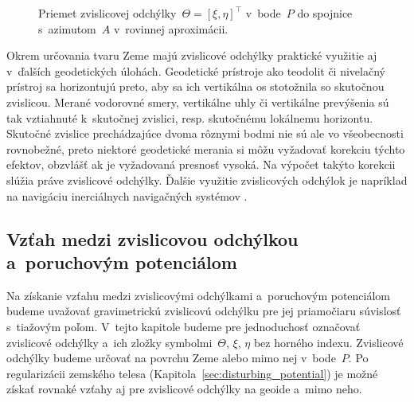 \documentclass[a4paper, 12pt]{book}
\begin{document}
\begin{figure}[bt]
\centering

\caption{Priemet zvislicovej odchýlky~$\Theta = [\xi, \eta]^\top$ v~bode~$P$ do 
spojnice s~azimutom~$A$ v~rovinnej aproximácii.}
\label{fig:deflections_projection}
\end{figure}

Okrem určovania tvaru Zeme majú zvislicové odchýlky praktické využitie aj 
v~ďalších geodetických úlohách.  Geodetické prístroje ako teodolit či nivelačný 
prístroj sa horizontujú preto, aby sa ich vertikálna os stotožnila so skutočnou 
zvislicou.  Merané vodorovné smery, vertikálne uhly či vertikálne prevýšenia sú 
tak vztiahnuté k~skutočnej zvislici, resp. skutočnému lokálnemu horizontu.  
Skutočné zvislice prechádzajúce dvoma rôznymi bodmi nie sú ale vo všeobecnosti 
rovnobežné, preto niektoré geodetické merania si môžu vyžadovať korekciu týchto 
efektov, obzvlášť ak je vyžadovaná presnosť vysoká.  Na výpočet takýto korekcii 
slúžia práve zvislicové odchýlky.  Ďalšie využitie zvislicových odchýlok je 
napríklad na navigáciu inerciálnych navigačných systémov \parencite[pozri 
napríklad][]{Jekeli2000}.


\subsection{Vzťah medzi zvislicovou odchýlkou a~poruchovým potenciálom}
\label{sec:deflections_disturbing_potential}

Na získanie vzťahu medzi zvislicovými odchýlkami a~poruchovým potenciálom 
budeme uvažovať gravimetrickú zvislicovú odchýlku pre jej priamočiaru súvislosť 
s~tiažovým poľom.  V~tejto kapitole budeme pre jednoduchosť označovať 
zvislicové odchýlky a~ich zložky symbolmi~$\Theta$, $\xi$, $\eta$ bez horného 
indexu.  Zvislicové odchýlky budeme určovať na povrchu Zeme alebo mimo nej 
v~bode~$P$.  Po regularizácii zemského telesa 
(Kapitola~\ref{sec:disturbing_potential}) je možné získať rovnaké vzťahy aj pre 
zvislicové odchýlky na geoide a~mimo neho.
\end{document}
